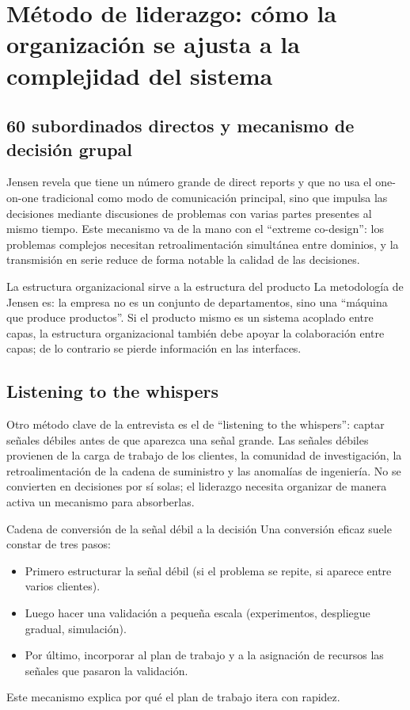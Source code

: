 \section{Método de liderazgo: cómo la organización se ajusta a la complejidad del sistema}

\subsection{60 subordinados directos y mecanismo de decisión grupal}

Jensen revela que tiene un número grande de direct reports y que no usa el one-on-one tradicional como modo de comunicación principal, sino que impulsa las decisiones mediante discusiones de problemas con varias partes presentes al mismo tiempo. Este mecanismo va de la mano con el ``extreme co-design'': los problemas complejos necesitan retroalimentación simultánea entre dominios, y la transmisión en serie reduce de forma notable la calidad de las decisiones.

\begin{importantbox}{La estructura organizacional sirve a la estructura del producto}
La metodología de Jensen es: la empresa no es un conjunto de departamentos, sino una ``máquina que produce productos''. Si el producto mismo es un sistema acoplado entre capas, la estructura organizacional también debe apoyar la colaboración entre capas; de lo contrario se pierde información en las interfaces.
\end{importantbox}

\subsection{Listening to the whispers}

Otro método clave de la entrevista es el de ``listening to the whispers'': captar señales débiles antes de que aparezca una señal grande. Las señales débiles provienen de la carga de trabajo de los clientes, la comunidad de investigación, la retroalimentación de la cadena de suministro y las anomalías de ingeniería. No se convierten en decisiones por sí solas; el liderazgo necesita organizar de manera activa un mecanismo para absorberlas.

\begin{knowledgebox}{Cadena de conversión de la señal débil a la decisión}
Una conversión eficaz suele constar de tres pasos:
\begin{itemize}
    \item Primero estructurar la señal débil (si el problema se repite, si aparece entre varios clientes).
    \item Luego hacer una validación a pequeña escala (experimentos, despliegue gradual, simulación).
    \item Por último, incorporar al plan de trabajo y a la asignación de recursos las señales que pasaron la validación.
\end{itemize}
Este mecanismo explica por qué el plan de trabajo itera con rapidez.
\end{knowledgebox}

